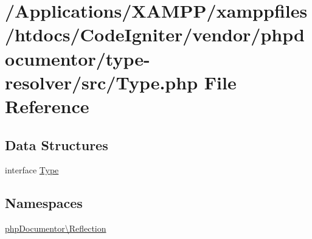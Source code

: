 \hypertarget{phpdocumentor_2type-resolver_2src_2_type_8php}{}\section{/\+Applications/\+X\+A\+M\+P\+P/xamppfiles/htdocs/\+Code\+Igniter/vendor/phpdocumentor/type-\/resolver/src/\+Type.php File Reference}
\label{phpdocumentor_2type-resolver_2src_2_type_8php}
\subsection*{Data Structures}
\begin{DoxyCompactItemize}
\item 
interface \mbox{\hyperlink{interfacephp_documentor_1_1_reflection_1_1_type}{Type}}
\end{DoxyCompactItemize}
\subsection*{Namespaces}
\begin{DoxyCompactItemize}
\item 
 \mbox{\hyperlink{namespacephp_documentor_1_1_reflection}{php\+Documentor\textbackslash{}\+Reflection}}
\end{DoxyCompactItemize}
